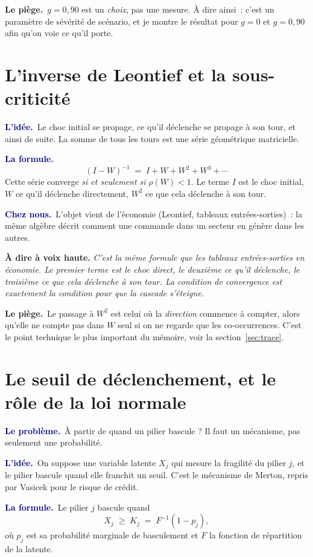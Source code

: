 \documentclass[11pt,a4paper]{article}
\newcommand{\lequoi}[1]{\smallskip\noindent\textcolor{navy}{\textbf{Le problème.}}\ #1\par}
\newcommand{\lidee}[1]{\smallskip\noindent\textcolor{navy}{\textbf{L'idée.}}\ #1\par}
\newcommand{\laformule}[1]{\smallskip\noindent\textcolor{navy}{\textbf{La formule.}}\ #1\par}
\newcommand{\cheznous}[1]{\smallskip\noindent\textcolor{navy}{\textbf{Chez nous.}}\ #1\par}
\newcommand{\lepiege}[1]{\smallskip\noindent\textcolor{accent}{\textbf{Le piège.}}\ #1\par}
\newcommand{\laphrase}[1]{\begin{phrasebox}\textbf{À dire à voix haute.} \emph{#1}\end{phrasebox}}
\begin{document}
\lepiege{$g=0{,}90$ est un \emph{choix}, pas une mesure. À dire ainsi~: \og c'est un
paramètre de sévérité de scénario, et je montre le résultat pour $g=0$ et $g=0{,}90$ afin
qu'on voie ce qu'il porte\fg{}.}

\section{L'inverse de Leontief et la sous-criticité}

\lidee{Le choc initial se propage, ce qu'il déclenche se propage à son tour, et ainsi de
suite. La somme de tous les tours est une série géométrique matricielle.}

\laformule{
\[
  (I-W)^{-1} \;=\; I + W + W^2 + W^3 + \cdots
\]
Cette série converge \emph{si et seulement si} $\rho(W)<1$. Le terme $I$ est le choc
initial, $W$ ce qu'il déclenche directement, $W^2$ ce que cela déclenche à son tour.}

\cheznous{L'objet vient de l'économie (Leontief, tableaux entrées-sorties)~: la même algèbre
décrit comment une commande dans un secteur en génère dans les autres.}

\laphrase{C'est la même formule que les tableaux entrées-sorties en économie. Le premier
terme est le choc direct, le deuxième ce qu'il déclenche, le troisième ce que cela déclenche
à son tour. La condition de convergence est exactement la condition pour que la cascade
s'éteigne.}

\lepiege{Le passage à $W^2$ est celui où la \emph{direction} commence à compter, alors
qu'elle ne compte pas dans $W$ seul si on ne regarde que les co-occurrences. C'est le point
technique le plus important du mémoire, voir la section~\ref{sec:trace}.}

\section{Le seuil de déclenchement, et le rôle de la loi normale}

\lequoi{À partir de quand un pilier bascule ? Il faut un mécanisme, pas seulement une
probabilité.}

\lidee{On suppose une variable latente $X_j$ qui mesure la fragilité du pilier $j$, et le
pilier bascule quand elle franchit un seuil. C'est le mécanisme de Merton, repris par
Vasicek pour le risque de crédit.}

\laformule{Le pilier $j$ bascule quand
\[
  X_j \;\ge\; K_j \;=\; F^{-1}(1-p_j),
\]
où $p_j$ est sa probabilité marginale de basculement et $F$ la fonction de répartition de la
latente.}
\end{document}
